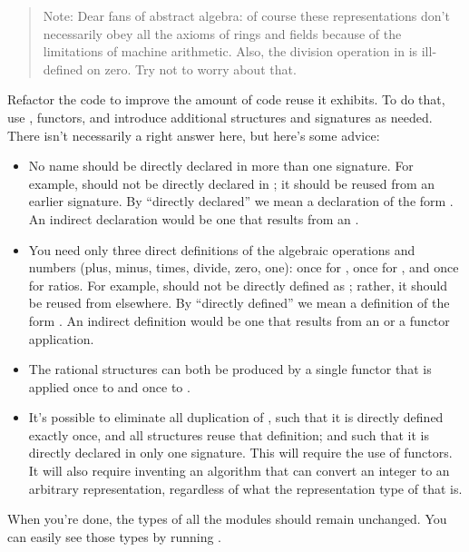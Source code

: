 \begin{quote}
  Note: Dear fans of abstract algebra: of course these representations don't necessarily obey all the axioms of rings and fields because of the limitations of machine arithmetic. Also, the division operation in  is ill-defined on zero. Try not to worry about that.
\end{quote}
Refactor the code to improve the amount of code reuse it exhibits. To do that, use , functors, and introduce additional structures and signatures as needed. There isn't necessarily a right answer here, but here's some advice:
\begin{itemize}
  \item No name should be directly declared in more than one signature. For example, \code{( + )} should not be directly declared in ; it should be reused from an earlier signature. By ``directly declared'' we mean a declaration of the form . An indirect declaration would be one that results from an .
  \item You need only three direct definitions of the algebraic operations and numbers (plus, minus, times, divide, zero, one): once for , once for , and once for ratios. For example,  should not be directly defined as ; rather, it should be reused from elsewhere. By ``directly defined'' we mean a definition of the form . An indirect definition would be one that results from an  or a functor application.
  \item The rational structures can both be produced by a single functor that is applied once to  and once to .
  \item It's possible to eliminate all duplication of , such that it is directly defined exactly once, and all structures reuse that definition; and such that it is directly declared in only one signature. This will require the use of functors. It will also require inventing an algorithm that can convert an integer to an arbitrary  representation, regardless of what the representation type of that  is.
\end{itemize}
When you're done, the types of all the modules should remain unchanged. You can easily see those types by running .


